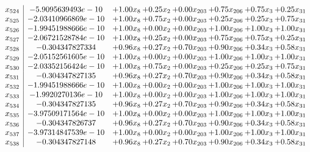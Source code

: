 \documentclass[8pt]{article}
\begin{document}
\[\begin{array}{c| c c@{\hskip 2pt} c@{\hskip 2pt} c@{\hskip 2pt} c@{\hskip 2pt} c@{\hskip 2pt} c@{\hskip 2pt} }
 x_{524}   &  -5.9095639493e-10 & +  1.00 x_{8} & +  0.25 x_{2} & +  0.00 x_{203} & +  0.75 x_{206} & +  0.75 x_{3} & +  0.25 x_{31}\\
 x_{525}   &  -2.03410966869e-10 & +  1.00 x_{8} & +  0.75 x_{2} & +  0.00 x_{203} & +  0.25 x_{206} & +  0.25 x_{3} & +  0.75 x_{31}\\
 x_{526}   &  -1.99451988666e-10 & +  1.00 x_{8} & +  0.00 x_{2} & +  0.00 x_{203} & +  1.00 x_{206} & +  1.00 x_{3} & +  1.00 x_{31}\\
 x_{527}   &  -2.06721528784e-10 & +  1.00 x_{8} & +  0.25 x_{2} & +  0.00 x_{203} & +  0.75 x_{206} & +  0.75 x_{3} & +  0.25 x_{31}\\
 x_{528}   &  -0.304347827334 & +  0.96 x_{8} & +  0.27 x_{2} & +  0.70 x_{203} & +  0.90 x_{206} & +  0.34 x_{3} & +  0.58 x_{31}\\
 x_{529}   &  -2.05152561605e-10 & +  1.00 x_{8} & +  0.00 x_{2} & +  0.00 x_{203} & +  1.00 x_{206} & +  1.00 x_{3} & +  1.00 x_{31}\\
 x_{530}   &  -2.03352156424e-10 & +  1.00 x_{8} & +  0.75 x_{2} & +  0.00 x_{203} & +  0.25 x_{206} & +  0.25 x_{3} & +  0.75 x_{31}\\
 x_{531}   &  -0.304347827135 & +  0.96 x_{8} & +  0.27 x_{2} & +  0.70 x_{203} & +  0.90 x_{206} & +  0.34 x_{3} & +  0.58 x_{31}\\
 x_{532}   &  -1.99451988666e-10 & +  1.00 x_{8} & +  0.00 x_{2} & +  0.00 x_{203} & +  1.00 x_{206} & +  1.00 x_{3} & +  1.00 x_{31}\\
 x_{533}   &  -1.9920270136e-10 & +  1.00 x_{8} & +  0.00 x_{2} & +  0.00 x_{203} & +  1.00 x_{206} & +  1.00 x_{3} & +  1.00 x_{31}\\
 x_{534}   &  -0.304347827135 & +  0.96 x_{8} & +  0.27 x_{2} & +  0.70 x_{203} & +  0.90 x_{206} & +  0.34 x_{3} & +  0.58 x_{31}\\
 x_{535}   &  -3.97509171564e-10 & +  1.00 x_{8} & +  0.00 x_{2} & +  0.00 x_{203} & +  1.00 x_{206} & +  1.00 x_{3} & +  1.00 x_{31}\\
 x_{536}   &  -0.304347826737 & +  0.96 x_{8} & +  0.27 x_{2} & +  0.70 x_{203} & +  0.90 x_{206} & +  0.34 x_{3} & +  0.58 x_{31}\\
 x_{537}   &  -3.97314847539e-10 & +  1.00 x_{8} & +  0.00 x_{2} & +  0.00 x_{203} & +  1.00 x_{206} & +  1.00 x_{3} & +  1.00 x_{31}\\
 x_{538}   &  -0.304347827148 & +  0.96 x_{8} & +  0.27 x_{2} & +  0.70 x_{203} & +  0.90 x_{206} & +  0.34 x_{3} & +  0.58 x_{31}\\

\end{array}\]
\end{document}

